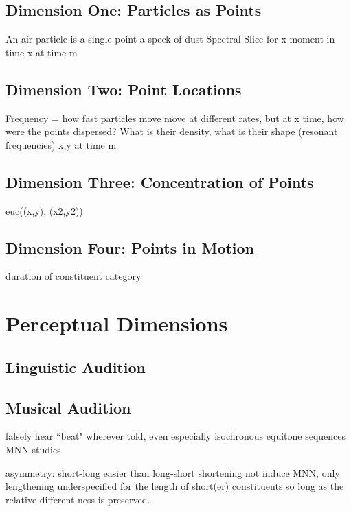 \subsection{Dimension One: Particles as Points}
An air particle is a single point
a speck of dust
Spectral Slice for x moment in time
x at time m
\subsection{Dimension Two: Point Locations}
Frequency = how fast particles move
move at different rates, but at x time, how were the points dispersed? What is their density, what is their shape (resonant frequencies) 
x,y at time m 
\subsection{Dimension Three: Concentration of Points}
euc((x,y), (x2,y2)) 
\subsection{Dimension Four: Points in Motion} 

duration of constituent category 


\section{Perceptual Dimensions}

\subsection{Linguistic Audition}
\subsection{Musical Audition} 

falsely hear ``beat" wherever told, even especially isochronous equitone sequences
MNN studies

asymmetry: short-long easier than long-short
shortening not induce MNN, only lengthening 
underspecified for the length of short(er) constituents so long as the relative different-ness is preserved. 